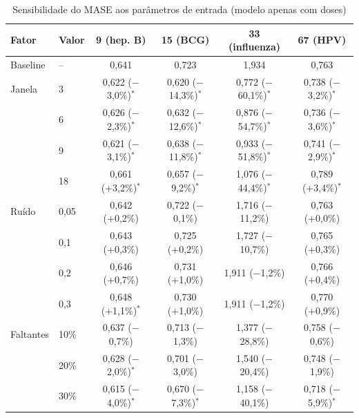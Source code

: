\documentclass[
    12pt,
    openright,
    oneside,
    a4paper,
    english,
    brazil
]{abntex2}
\begin{document}
\begin{table}[htb]
  \centering
  \caption{Sensibilidade do MASE aos parâmetros de entrada (modelo apenas com doses)}
  \label{tab:sens_entrada}
  \footnotesize
  \setlength{\tabcolsep}{3pt}
  \begin{tabular}{llcccc}
    \toprule
    \textbf{Fator} & \textbf{Valor} & \textbf{9 (hep. B)} & \textbf{15 (BCG)} & \textbf{33 (influenza)} & \textbf{67 (HPV)} \\
    \midrule
    Baseline & -- & 0,641 & 0,723 & 1,934 & 0,763 \\
    \midrule
    Janela & 3 & 0,622 ($-$3,0\%)$^{*}$ & 0,620 ($-$14,3\%)$^{*}$ & 0,772 ($-$60,1\%)$^{*}$ & 0,738 ($-$3,2\%)$^{*}$ \\
     & 6 & 0,626 ($-$2,3\%)$^{*}$ & 0,632 ($-$12,6\%)$^{*}$ & 0,876 ($-$54,7\%)$^{*}$ & 0,736 ($-$3,6\%)$^{*}$ \\
     & 9 & 0,621 ($-$3,1\%)$^{*}$ & 0,638 ($-$11,8\%)$^{*}$ & 0,933 ($-$51,8\%)$^{*}$ & 0,741 ($-$2,9\%)$^{*}$ \\
     & 18 & 0,661 (+3,2\%)$^{*}$ & 0,657 ($-$9,2\%)$^{*}$ & 1,076 ($-$44,4\%)$^{*}$ & 0,789 (+3,4\%)$^{*}$ \\
    \midrule
    Ruído & 0,05 & 0,642 (+0,2\%) & 0,722 ($-$0,1\%) & 1,716 ($-$11,2\%) & 0,763 (+0,0\%) \\
     & 0,1 & 0,643 (+0,3\%) & 0,725 (+0,2\%) & 1,727 ($-$10,7\%) & 0,765 (+0,3\%) \\
     & 0,2 & 0,646 (+0,7\%) & 0,731 (+1,0\%) & 1,911 ($-$1,2\%) & 0,766 (+0,4\%) \\
     & 0,3 & 0,648 (+1,1\%)$^{*}$ & 0,730 (+1,0\%) & 1,911 ($-$1,2\%) & 0,770 (+0,9\%) \\
    \midrule
    Faltantes & 10\% & 0,637 ($-$0,7\%) & 0,713 ($-$1,3\%) & 1,377 ($-$28,8\%) & 0,758 ($-$0,6\%) \\
     & 20\% & 0,628 ($-$2,0\%)$^{*}$ & 0,701 ($-$3,0\%) & 1,540 ($-$20,4\%) & 0,748 ($-$1,9\%) \\
     & 30\% & 0,615 ($-$4,0\%)$^{*}$ & 0,670 ($-$7,3\%)$^{*}$ & 1,158 ($-$40,1\%) & 0,718 ($-$5,9\%)$^{*}$ \\
    \bottomrule
  \end{tabular}
\end{table}
\end{document}
